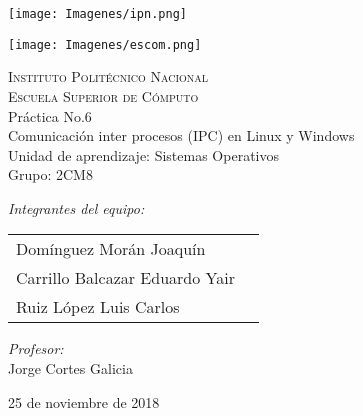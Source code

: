 \documentclass[12pt]{article}
\begin{document}
		\begin{titlepage}
			\begin{center}
				\noindent
				\begin{minipage}{0.5\textwidth}
					\begin{flushleft} \large
					\texttt{[image: Imagenes/ipn.png]}
					\end{flushleft}
				\end{minipage}%
				\begin{minipage}{0.55\textwidth}
					\begin{flushright} \large
			       	\texttt{[image: Imagenes/escom.png]}
					\end{flushright}
				\end{minipage}
				\textsc{\LARGE Instituto Politécnico Nacional}\\[0.5cm]
				\textsc{\Large Escuela Superior de Cómputo}\\[1cm]
				{ \huge Práctica No.6 \\[1cm] }
				{\huge Comunicación inter procesos (IPC) en Linux y Windows \\[1cm]}
				{ \Large Unidad de aprendizaje: Sistemas Operativos} \\[1cm]
				{ \Large Grupo: 2CM8 } \\[1cm]
				\noindent
				\begin{minipage}{0.5\textwidth}
					\begin{flushleft} \large
						\emph{Integrantes del equipo:}\\
						\begin{tabular}{ll}
					     Domínguez Morán Joaquín\\
					     Carrillo Balcazar Eduardo Yair\\
					     Ruiz López Luis Carlos\\
					\end{tabular}
					\end{flushleft}
				\end{minipage}%
				\begin{minipage}{0.5\textwidth}
					\begin{flushright} \large
						\emph{Profesor:} \\
						Jorge Cortes Galicia 
					\end{flushright}
				\end{minipage}
				
				\vfill
				{\large 25 de noviembre de 2018}
			\end{center}
		\end{titlepage}
		
\end{document}
